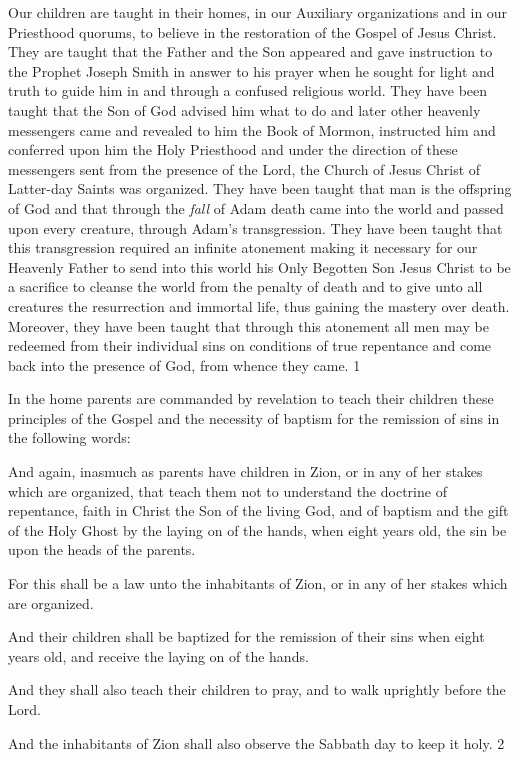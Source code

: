 Our children are taught in their homes, in our Auxiliary organizations and in our Priesthood
quorums, to believe in the restoration of the Gospel of Jesus Christ. They are taught that the
Father and the Son appeared and gave instruction to the Prophet Joseph Smith in answer to
his prayer when he sought for light and truth to guide him in and through a confused
religious world. They have been taught that the Son of God advised him what to do and later
other heavenly messengers came and revealed to him the Book of Mormon, instructed him
and conferred upon him the Holy Priesthood and under the direction of these messengers sent
from the presence of the Lord, the Church of Jesus Christ of Latter-day Saints was organized.
They have been taught that man is the offspring of God and that through the \textit{fall} of Adam
death came into the world and passed upon every creature, through Adam's transgression.
They have been taught that this transgression required an infinite atonement making it
necessary for our Heavenly Father to send into this world his Only Begotten Son Jesus Christ
to be a sacrifice to cleanse the world from the penalty of death and to give unto all creatures
the resurrection and immortal life, thus gaining the mastery over death. Moreover, they have
been taught that through this atonement all men may be redeemed from their individual sins
on conditions of true repentance and come back into the presence of God, from whence they
came. 1

In the home parents are commanded by revelation to teach their children these principles of
the Gospel and the necessity of baptism for the remission of sins in the following words:

And again, inasmuch as parents have children in Zion, or in any of her stakes which are
organized, that teach them not to understand the doctrine of repentance, faith in Christ the
Son of the living God, and of baptism and the gift of the Holy Ghost by the laying on of the
hands, when eight years old, the sin be upon the heads of the parents.

For this shall be a law unto the inhabitants of Zion, or in any of her stakes which are
organized.

And their children shall be baptized for the remission of their sins when eight years old, and
receive the laying on of the hands.

And they shall also teach their children to pray, and to walk uprightly before the Lord.

And the inhabitants of Zion shall also observe the Sabbath day to keep it holy. 2


